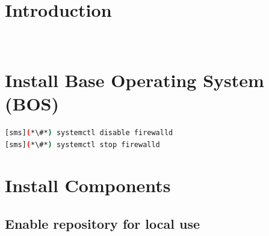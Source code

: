 \documentclass[letterpaper]{article}
\begin{document}
\graphicspath{{common/figures/}}
\thispagestyle{empty}




\newpage
\tableofcontents
\newpage


\section{Introduction} \label{sec:introduction}

 \\








\section{Install Base Operating System (BOS)}


\begin{lstlisting}[language=bash,keywords={}]
[sms](*\#*) systemctl disable firewalld
[sms](*\#*) systemctl stop firewalld
\end{lstlisting}


\section{Install \OHPC{} Components} \label{sec:basic_install}


\subsection{Enable \OHPC{} repository for local use} \label{sec:enable_repo}



\end{document}
